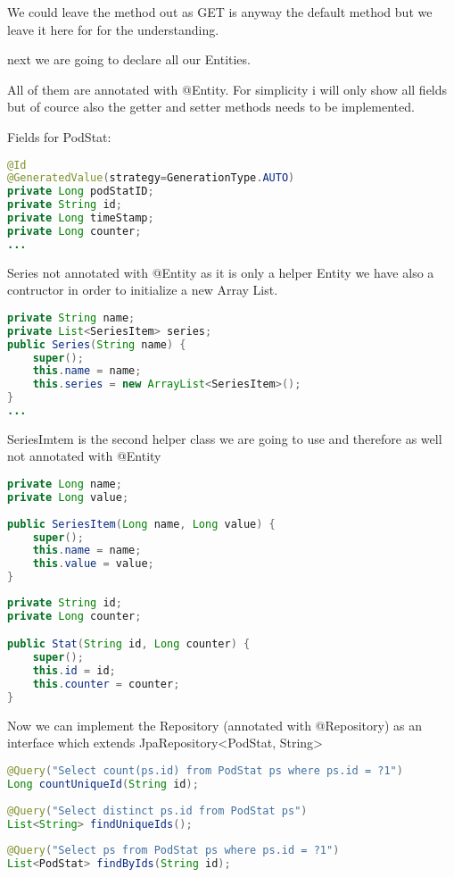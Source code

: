 We could leave the method out as GET is anyway the default method but we leave it here for for the understanding.

next we are going to declare all our Entities.

All of them are annotated with @Entity.
For simplicity i will only show all fields but of cource also the getter and setter methods needs to be implemented.

Fields for PodStat:

\begin{lstlisting}[language=Java]
@Id
@GeneratedValue(strategy=GenerationType.AUTO)
private Long podStatID;
private String id;
private Long timeStamp;
private Long counter;
...
\end{lstlisting}

Series not annotated with @Entity as it is only a helper Entity we have also a contructor in order to initialize a new Array List.
\begin{lstlisting}[language=Java]
private String name;
private List<SeriesItem> series;
public Series(String name) {
	super();
	this.name = name;
	this.series = new ArrayList<SeriesItem>();
}
...
\end{lstlisting}

SeriesImtem is the second helper class we are going to use and therefore as well not annotated with @Entity
\begin{lstlisting}[language=Java]
private Long name;
private Long value;
	
public SeriesItem(Long name, Long value) {
	super();
	this.name = name;
	this.value = value;
}
\end{lstlisting}


\begin{lstlisting}[language=Java]
private String id;
private Long counter;

public Stat(String id, Long counter) {
	super();
	this.id = id;
	this.counter = counter;
}
\end{lstlisting}

Now we can implement the Repository (annotated with @Repository) as an interface which extends JpaRepository<PodStat, String>

\begin{lstlisting}[language=Java]
@Query("Select count(ps.id) from PodStat ps where ps.id = ?1")
Long countUniqueId(String id);
	
@Query("Select distinct ps.id from PodStat ps")
List<String> findUniqueIds();
	
@Query("Select ps from PodStat ps where ps.id = ?1")
List<PodStat> findByIds(String id);
\end{lstlisting}

